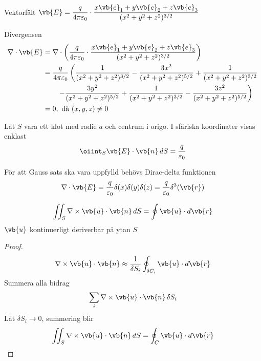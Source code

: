 \begin{example}
Vektorfält $\displaystyle \vb{E} = \frac{q}{4\pi\varepsilon_0} \cdot \frac{x\vb{e}_1 + y\vb{e}_2 + z\vb{e}_3}{(x^2 + y^2 + z^2)^{3/2}}$

Divergensen
\begin{align*}
\nabla \cdot \vb{E} &= \nabla \cdot \left( \frac{q}{4\pi\varepsilon_0} \cdot \frac{x\vb{e}_1 + y\vb{e}_2 + z\vb{e}_3}{(x^2 + y^2 + z^2)^{3/2}} \right) \\
&= \frac{q}{4\pi\varepsilon_0} \left( \frac{1}{(x^2 + y^2 + z^2)^{3/2}} - \frac{3x^2}{(x^2 + y^2 + z^2)^{5/2}} + \frac{1}{(x^2 + y^2 + z^2)^{3/2}} \right. \\
&\qquad \left. - \frac{3y^2}{(x^2 + y^2 + z^2)^{5/2}} + \frac{1}{(x^2 + y^2 + z^2)^{3/2}} - \frac{3z^2}{(x^2 + y^2 + z^2)^{5/2}} \right) \\
&= 0, \text{ då } (x, y, z) \neq 0
\end{align*}

Låt $S$ vara ett klot med radie $a$ och centrum i origo. I sfäriska koordinater visas enklast
\[ \oiint_S \vb{E} \cdot \vb{n}\,dS = \frac{q}{\varepsilon_0} \]

För att Gauss sats ska vara uppfylld behövs Dirac-delta funktionen
\[ \nabla \cdot \vb{E} = \frac{q}{\varepsilon_0}\delta(x)\delta(y)\delta(z) = \frac{q}{\varepsilon_0}\delta^3(\vb{r}) \]
\end{example}

\begin{minipage}{0.7\linewidth}
\begin{theorem}
\[ \iint_S \nabla \times \vb{u} \cdot \vb{n}\,dS = \oint \vb{u} \cdot d\vb{r} \]
$\vb{u}$ kontinuerligt deriverbar på ytan $S$
\end{theorem}
\end{minipage}
\begin{minipage}{0.28\linewidth}
\end{minipage}

\begin{proof}
\[ \nabla \times \vb{u} \cdot \vb{n} \approx \frac{1}{\delta S_i} \oint_{\delta C_i} \vb{u} \cdot d\vb{r} \]
Summera alla bidrag
\[ \sum_i \nabla \times \vb{u} \cdot \vb{n}\,\delta S_i \]
Låt $\delta S_i \to 0$, summering blir
\[ \iint_S \nabla \times \vb{u} \cdot \vb{n}\,dS = \oint_C \vb{u} \cdot d\vb{r} \]
\end{proof}
